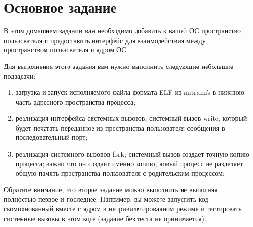 \section{Основное задание}

В этом домашнем задании вам необходимо добавить к вашей ОС пространство
пользователя и предоставить интерфейс для взаимодействия между пространством
пользователя и ядром ОС.

Для выполнения этого задания вам нужно выполнить следующие небольшие подзадачи:

\begin{enumerate}
  \item загрузка и запуск исполняемого файла формата ELF из initramfs в нижнюю
        часть адресного пространства процесса;
  \item реализация интерфейса системных вызовов, системный вызов write, который
        будет печатать переданное из пространства пользователя сообщения в
        последовательный порт;
  \item реализация системного вызовов fork; системный вызов создает точную
        копию процесса; важно что он создает именно копию, новый процесс не
        разделяет общую память пространства пользователя с родительским процессом;
\end{enumerate}

Обратите внимание, что второе задание можно выполнить не выполняя полностью
первое и последнее. Например, вы можете запустить код скомпонованный вместе с
ядром в непривилегированном режиме и тестировать системные вызовы в этом коде
(задание без теста не принимается).
